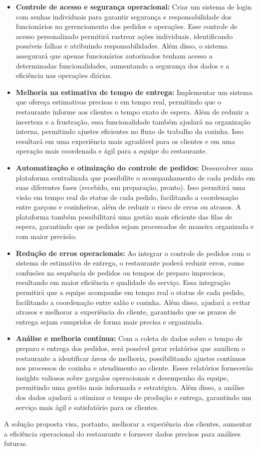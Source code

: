 \begin{itemize}
    \item \textbf{Controle de acesso e segurança operacional:} Criar um sistema de login com senhas individuais para garantir segurança e responsabilidade dos funcionários no gerenciamento dos pedidos e operações. Esse controle de acesso personalizado permitirá rastrear ações individuais, identificando possíveis falhas e atribuindo responsabilidades. Além disso, o sistema assegurará que apenas funcionários autorizados tenham acesso a determinadas funcionalidades, aumentando a segurança dos dados e a eficiência nas operações diárias.
    
    \item \textbf{Melhoria na estimativa de tempo de entrega:} 
    Implementar um sistema que ofereça estimativas precisas e em tempo real, permitindo que o restaurante informe aos clientes o tempo exato de espera. Além de reduzir a incerteza e a frustração, essa funcionalidade também ajudará na organização interna, permitindo ajustes eficientes no fluxo de trabalho da cozinha. Isso resultará em uma experiência mais agradável para os clientes e em uma operação mais coordenada e ágil para a equipe do restaurante.
    
    \item \textbf{Automatização e otimização do controle de pedidos:} 
    Desenvolver uma plataforma centralizada que possibilite o acompanhamento de cada pedido em suas diferentes fases (recebido, em preparação, pronto). Isso permitirá uma visão em tempo real do status de cada pedido, facilitando a coordenação entre garçons e cozinheiros, além de reduzir o risco de erros ou atrasos. A plataforma também possibilitará uma gestão mais eficiente das filas de espera, garantindo que os pedidos sejam processados de maneira organizada e com maior precisão.

    \item \textbf{Redução de erros operacionais:} 
    Ao integrar o controle de pedidos com o sistema de estimativa de entrega, o restaurante poderá reduzir erros, como confusões na sequência de pedidos ou tempos de preparo imprecisos, resultando em maior eficiência e qualidade do serviço. Essa integração permitirá que a equipe acompanhe em tempo real o status de cada pedido, facilitando a coordenação entre salão e cozinha. Além disso, ajudará a evitar atrasos e melhorar a experiência do cliente, garantindo que os prazos de entrega sejam cumpridos de forma mais precisa e organizada.

    \item \textbf{Análise e melhoria contínua:} 
    Com a coleta de dados sobre o tempo de preparo e entrega dos pedidos, será possível gerar relatórios que auxiliem o restaurante a identificar áreas de melhoria, possibilitando ajustes contínuos nos processos de cozinha e atendimento ao cliente. Esses relatórios fornecerão insights valiosos sobre gargalos operacionais e desempenho da equipe, permitindo uma gestão mais informada e estratégica. Além disso, a análise dos dados ajudará a otimizar o tempo de produção e entrega, garantindo um serviço mais ágil e satisfatório para os clientes.
\end{itemize}

A solução proposta visa, portanto, melhorar a experiência dos clientes, aumentar a eficiência operacional do restaurante e fornecer dados precisos para análises futuras.